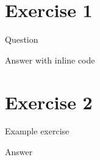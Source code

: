 \section*{Exercise 1}\label{ch:exercise-1}

\begin{quotem}
Question
\end{quotem}

Answer with inline code

\section*{Exercise 2}\label{ch:exercise-2}

\begin{quotem}
Example exercise
\end{quotem}

Answer